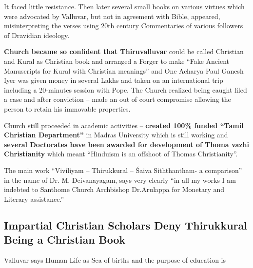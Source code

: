 It faced little resistance. Then later several small books on various virtues which were advocated by Valluvar, but not in agreement with Bible, appeared, misinterpreting the verses using 20th century Commentaries of various followers of Dravidian ideology.

\textbf{Church became so confident that Thiruvalluvar} could be called Christian and Kural as Christian book and arranged a Forger to make “Fake Ancient Manuscripts for Kural with Christian meanings” and One Acharya Paul Ganesh Iyer was given money in several Lakhs and taken on an international trip including a 20-minutes session with Pope. The Church realized being caught filed a case and after conviction – made an out of court compromise allowing the person to retain his immovable properties.

Church still proceeded in academic activities – \textbf{created 100\% funded “Tamil Christian Department”} in Madras University which is still working and \textbf{several Doctorates have been awarded for development of Thoma vazhi Christianity} which meant “Hinduism is an offshoot of Thomas Christianity”.

The main work “Viviliyam – Thirukkural – Śaiva Siththantham- a comparison” in the name of Dr. M. Deivanayagam, says very clearly “in all my works I am indebted to Santhome Church Archbishop Dr.Arulappa for Monetary and Literary assistance.”

\subsection*{Impartial Christian Scholars Deny Thirukkural Being a Christian Book}

Valluvar says Human Life as Sea of births and the purpose of education is

